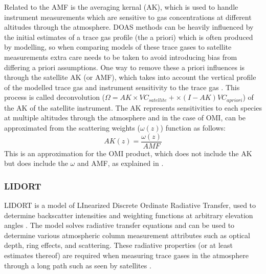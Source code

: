     Related to the AMF is the averaging kernal (AK), which is used to handle instrument measurements which are sensitive to gas concentrations at different altitudes through the atmosphere.
    DOAS methods can be heavily influenced by the initial estimates of a trace gas profile (the a priori) which is often produced by modelling, so when comparing models of these trace gases to satellite measurements extra care needs to be taken to avoid introducing bias from differing a priori assumptions.
    One way to remove these a priori influences is through the satellite AK (or AMF), which takes into account the vertical profile of the modelled trace gas and instrument sensitivity to the trace gas \parencite{Eskes2003, Palmer2001}.
    This process is called deconvolution ($\Omega = AK \times VC_{satellite} + \times (I - AK) VC_{a priori}$) of the AK of the satellite instrument.
    The AK represents sensitivities to each species at multiple altitudes through the atmosphere and in the case of OMI, can be approximated from the scattering weights ($\omega(z)$) function as follows:
    \begin{equation} \label{ch_HCHO:eqn:AKfromw}
    AK(z) = \frac{\omega(z)}{AMF}
    \end{equation}
    This is an approximation for the OMI product, which does not include the AK but does include the $\omega$ and AMF, as explained in \textcite{Abad2015}.
    
  \subsubsection{LIDORT}
    \label{Model:Meas:sat:LIDORT}
    
    LIDORT is a model of LInearized Discrete Ordinate Radiative Transfer, used to determine backscatter intensities and weighting functions at arbitrary elevation angles \parencite{Spurr2001}.
    The model solves radiative transfer equations and can be used to determine various atmospheric column measurement attributes such as optical depth, ring effects, and scattering.
    These radiative properties (or at least estimates thereof) are required when measuring trace gases in the atmosphere through a long path such as seen by satellites \parencite[eg.][]{Palmer2001,Martin2002a,DeSmedt2015,Abad2015}.
  

